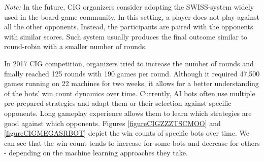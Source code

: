{\em Note:} In the future, CIG organizers consider adopting the SWISS-system widely used in the board game community. In this setting, a player does not play against all the other opponents. Instead, the participants are paired with the opponents with similar scores. Such system usually produces the final outcome similar to round-robin with a smaller number of rounds. 

In 2017 CIG competition, organizers tried to increase the number of rounds and finally reached 125 rounds with 190 games per round. Although it required 47,500 games running on 22 machines for two weeks, it allows for a better understanding of the bots' win count dynamics over time. Currently, AI bots often use multiple pre-prepared strategies and adapt them or their selection against specific opponents. Long gameplay experience allows them to learn which strategies are good against which opponents. 
Figures \ref{figureCIGZZZTSCMOO} and \ref{figureCIGMEGASRBOT} depict the win counts of specific bots over time. We can see that the win count tends to increase for some bots and decrease for others - depending on the machine learning approaches they take. 

